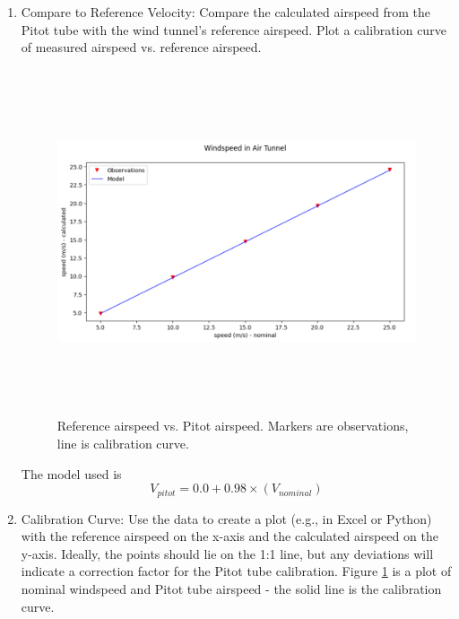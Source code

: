 \documentclass[12pt]{article}
\begin{document}
\clearpage
\begin{enumerate}

\item Compare to Reference Velocity:
Compare the calculated airspeed from the Pitot tube with the wind tunnel’s reference airspeed. Plot a calibration curve of measured airspeed vs. reference airspeed.

\begin{figure}[h!] %
   \centering
   \includegraphics[height=4in]{Calibration.png} 
   \caption{Reference airspeed vs. Pitot airspeed.  Markers are observations, line is calibration curve.}
   \label{fig:windspeed}
\end{figure}

The model used is
\begin{equation}
V_{pitot}=0.0+0.98\times(V_{nominal})
\end{equation}

\item Calibration Curve: Use the data to create a plot (e.g., in Excel or Python) with the reference airspeed on the x-axis and the calculated airspeed on the y-axis. Ideally, the points should lie on the 1:1 line, but any deviations will indicate a correction factor for the Pitot tube calibration. Figure \ref{fig:windspeed} is a plot of nominal windspeed and Pitot tube airspeed - the solid line is the calibration curve.

\end{enumerate}
\clearpage
\end{document}
